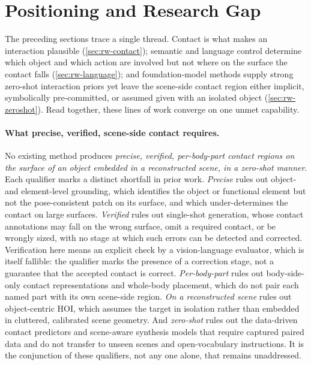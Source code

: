 \section{Positioning and Research Gap}
\label{sec:rw-positioning}

The preceding sections trace a single thread. Contact is what makes an interaction plausible (\cref{sec:rw-contact}); semantic and language control determine which object and which action are involved but not where on the surface the contact falls (\cref{sec:rw-language}); and foundation-model methods supply strong zero-shot interaction priors yet leave the scene-side contact region either implicit, symbolically pre-committed, or assumed given with an isolated object (\cref{sec:rw-zeroshot}). Read together, these lines of work converge on one unmet capability.

\paragraph{What precise, verified, scene-side contact requires.} No existing method produces \emph{precise, verified, per-body-part contact regions on the surface of an object embedded in a reconstructed scene, in a zero-shot manner}. Each qualifier marks a distinct shortfall in prior work. \emph{Precise} rules out object- and element-level grounding, which identifies the object or functional element but not the pose-consistent patch on its surface, and which under-determines the contact on large surfaces. \emph{Verified} rules out single-shot generation, whose contact annotations may fall on the wrong surface, omit a required contact, or be wrongly sized, with no stage at which such errors can be detected and corrected. Verification here means an explicit check by a vision-language evaluator, which is itself fallible: the qualifier marks the presence of a correction stage, not a guarantee that the accepted contact is correct. \emph{Per-body-part} rules out body-side-only contact representations and whole-body placement, which do not pair each named part with its own scene-side region. \emph{On a reconstructed scene} rules out object-centric HOI, which assumes the target in isolation rather than embedded in cluttered, calibrated scene geometry. And \emph{zero-shot} rules out the data-driven contact predictors and scene-aware synthesis models that require captured paired data and do not transfer to unseen scenes and open-vocabulary instructions. It is the conjunction of these qualifiers, not any one alone, that remains unaddressed.

